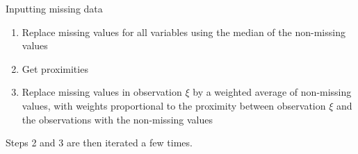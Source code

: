 \documentclass[11pt,compress,t,notes=noshow, xcolor=table]{beamer}
\begin{document}
\begin{frame}{Inputting missing data}
\begin{center}
\end{center}
\begin{enumerate}
\item Replace missing values for all variables using the median of the non-missing values
\item Get proximities
\item Replace missing values in observation $\xi$ by a weighted average of non-missing values, with weights proportional to the proximity between observation $\xi$ and the observations with the non-missing values
\end{enumerate}
Steps 2 and 3 are then iterated a few times. %
\end{frame}

\endlecture
\end{document}
